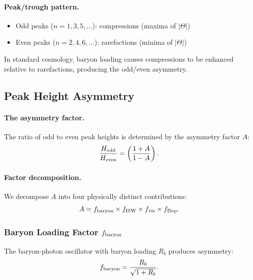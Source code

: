\paragraph{Peak/trough pattern.}
\begin{itemize}[nosep]
\item Odd peaks ($n = 1, 3, 5, \ldots$): compressions (maxima of $|\Theta|$)
\item Even peaks ($n = 2, 4, 6, \ldots$): rarefactions (minima of $|\Theta|$)
\end{itemize}

In standard cosmology, baryon loading causes compressions to be enhanced relative to rarefactions, producing the odd/even asymmetry.

\subsection{Peak Height Asymmetry}\label{app:peak-asymmetry}

\paragraph{The asymmetry factor.}
The ratio of odd to even peak heights is determined by the asymmetry factor $A$:
\begin{equation}
\frac{H_{\rm odd}}{H_{\rm even}} = \left(\frac{1+A}{1-A}\right).
\end{equation}

\paragraph{Factor decomposition.}
We decompose $A$ into four physically distinct contributions:
\begin{equation}\label{eq:app-A-decomp}
A = f_{\rm baryon} \times f_{\rm ISW} \times f_{\rm vis} \times f_{\rm Dop}.
\end{equation}

\subsubsection{Baryon Loading Factor $f_{\rm baryon}$}

The baryon-photon oscillator with baryon loading $R_b$ produces asymmetry:
\begin{equation}
f_{\rm baryon} = \frac{R_b}{\sqrt{1+R_b}}.
\end{equation}

